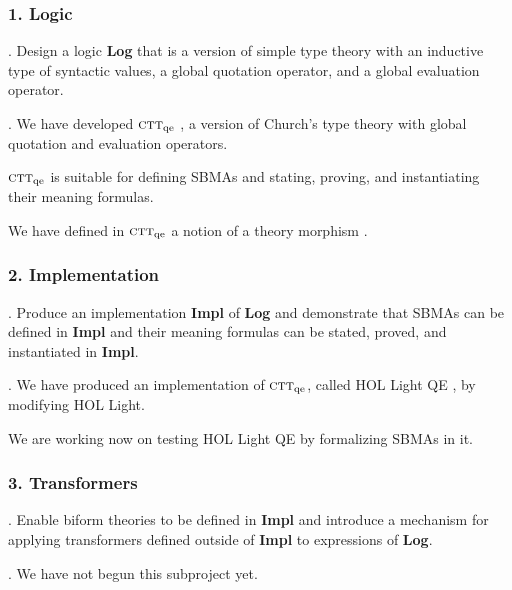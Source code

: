 \documentclass[t,12pt,numbers,fleqn]{beamer}
\newcommand{\churchqe}{$\mbox{\sc ctt}_{\rm qe}$}
\begin{document}
\begin{frame}
\frametitle{1. Logic}
\bi

  \item {}.  Design a logic \textbf{Log} that is a version of
    simple type theory with an inductive type of syntactic values, a
    global quotation operator, and a global evaluation operator.

\pause

  \item {}.  We have developed {\churchqe}
    \bbrown{[Far18]}, a version of Church's type theory with global
    quotation and evaluation operators.

  \bi

    \item {\churchqe} is suitable for defining SBMAs and stating,
      proving, and instantiating their meaning formulas.

    \item We have defined in {\churchqe} a notion of a theory morphism
      \bbrown{[Far17]}.

  \ei

\ei
\end{frame}


\begin{frame}
\frametitle{2. Implementation}
\bi

  \item {}.  Produce an implementation \textbf{Impl} of
    \textbf{Log} and demonstrate that SBMAs can be defined in
    \textbf{Impl} and their meaning formulas can be stated, proved,
    and instantiated in \textbf{Impl}.

\pause

  \item {}.  We have produced an implementation of
    {\churchqe}, called HOL Light QE \bbrown{[CarFarLas18]}, by
      modifying HOL Light.

  \bi

    \item We are working now on testing HOL Light QE by formalizing
      SBMAs in it.

  \ei

\ei
\end{frame}


\begin{frame}
\frametitle{3. Transformers}
\bi

  \item {}. Enable biform theories to be defined in
    \textbf{Impl} and introduce a mechanism for applying transformers
    defined outside of \textbf{Impl} to expressions of \textbf{Log}.

\pause

  \item {}.  We have not begun this subproject yet.

\ei
\end{frame}
\end{document}
